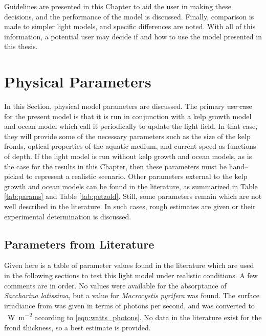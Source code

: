 \documentclass[ms,cpyr,lof,lot]{uathesis}
\providecommand{\DIFadd}[1]{{\protect\color{blue}\uwave{#1}}} %
\providecommand{\DIFdel}[1]{{\protect\color{red}\sout{#1}}}                      %
\providecommand{\DIFaddbegin}{} %
\providecommand{\DIFaddend}{} %
\providecommand{\DIFdelbegin}{} %
\providecommand{\DIFdelend}{} %
\newcommand{\DIFscaledelfig}{0.5}
\newlength{\DIFdelgraphicswidth} %
\newlength{\DIFdelgraphicsheight} %
\newcommand{\DIFaddincludegraphics}[2][]{{\color{blue}\fbox{\DIFOincludegraphics[#1]{#2}}}} %
\newcommand{\DIFdelincludegraphics}[2][]{%
\sbox{\DIFdelgraphicsbox}{\DIFOincludegraphics[#1]{#2}}%
\settoboxwidth{\DIFdelgraphicswidth}{\DIFdelgraphicsbox} %
\settoboxtotalheight{\DIFdelgraphicsheight}{\DIFdelgraphicsbox} %
\scalebox{\DIFscaledelfig}{%
\parbox[b]{\DIFdelgraphicswidth}{\usebox{\DIFdelgraphicsbox}\\[-\baselineskip] \rule{\DIFdelgraphicswidth}{0em}}\llap{\resizebox{\DIFdelgraphicswidth}{\DIFdelgraphicsheight}{%
\setlength{\unitlength}{\DIFdelgraphicswidth}%
\begin{picture}(1,1)%
\thicklines\linethickness{2pt} %
{\color[rgb]{1,0,0}\put(0,0){\framebox(1,1){}}}%
{\color[rgb]{1,0,0}\put(0,0){\line( 1,1){1}}}%
{\color[rgb]{1,0,0}\put(0,1){\line(1,-1){1}}}%
\end{picture}%
}\hspace*{3pt}}} %
} %
\DeclareRobustCommand{\DIFaddbegin}{\DIFOaddbegin \let\includegraphics\DIFaddincludegraphics} %
\DeclareRobustCommand{\DIFaddend}{\DIFOaddend \let\includegraphics\DIFOincludegraphics} %
\DeclareRobustCommand{\DIFdelbegin}{\DIFOdelbegin \let\includegraphics\DIFdelincludegraphics} %
\DeclareRobustCommand{\DIFdelend}{\DIFOaddend \let\includegraphics\DIFOincludegraphics} %
\begin{document}
Guidelines are presented in this Chapter to aid the user in making these decisions, and the performance of the model is discussed.
Finally, comparison is made to simpler light models, and specific differences are noted.
With all of this information, a potential user may decide if and how to use the model presented in this thesis.

\section{Physical Parameters}
\label{sec:parameters}
In this Section, physical model parameters are discussed.
The primary \DIFdelbegin \DIFdel{use case }\DIFdelend \DIFaddbegin \DIFadd{use--case }\DIFaddend for the present model is that it is run in conjunction with a kelp growth model and ocean model
which call it periodically to update the light field.
In that case, they will provide some of the necessary parameters such as the size of the kelp fronds, optical properties of the aquatic medium, and current speed as functions of depth.
If the light model is run without kelp growth and ocean models, as is the case for the results in this Chapter, then these parameters must be hand--picked to represent a realistic scenario.
Other parameters external to the kelp growth and ocean models can be found in the literature,
as summarized in Table \ref{tab:params} and Table \ref{tab:petzold}.
Still, some parameters remain which are not well described in the literature.
In such cases, rough estimates are given or their experimental determination is discussed.

\subsection{Parameters from Literature}
Given here is a table of parameter values found in the literature which are used in the following sections to test this light model under realistic conditions.
A few comments are in order.
No values were available for the absorptance of \textit{Saccharina latissima}, but a value for \textit{Macrocystis pyrifera} was found.
The surface irradiance from \cite{broch_modelling_2012} was given in terms of photons per second,
and was converted to \SI{}{\W\per\m\squared} according to \eqref{eqn:watts_photons}.
No data in the literature exist for the frond thickness, so a best estimate is provided.
\end{document}
